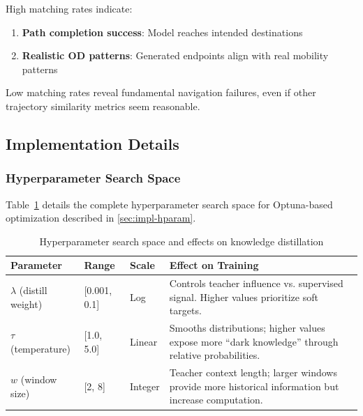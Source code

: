 High matching rates indicate:
\begin{enumerate}[noitemsep,topsep=0pt]
    \item \textbf{Path completion success}: Model reaches intended destinations
    \item \textbf{Realistic OD patterns}: Generated endpoints align with real mobility patterns
\end{enumerate}

Low matching rates reveal fundamental navigation failures, even if other trajectory similarity metrics seem reasonable.

\subsection{Implementation Details}
\label{app:implementation}

\subsubsection{Hyperparameter Search Space}
\label{app:hyperparam-space}

Table~\ref{tab:hyperparam-search-appendix} details the complete hyperparameter search space for Optuna-based optimization described in \autoref{sec:impl-hparam}.

\begin{table}[H]
    \centering
    \caption{Hyperparameter search space and effects on knowledge distillation}
    \label{tab:hyperparam-search-appendix}
    \begin{tabular}{lll p{5.5cm}}
        \toprule
        \textbf{Parameter}         & \textbf{Range} & \textbf{Scale} & \textbf{Effect on Training}                                                                          \\
        \midrule
        $\lambda$ (distill weight) & [0.001, 0.1]   & Log            & Controls teacher influence vs. supervised signal. Higher values prioritize soft targets.             \\
        \addlinespace
        $\tau$ (temperature)       & [1.0, 5.0]     & Linear         & Smooths distributions; higher values expose more ``dark knowledge'' through relative probabilities.  \\
        \addlinespace
        $w$ (window size)          & [2, 8]         & Integer        & Teacher context length; larger windows provide more historical information but increase computation. \\
        \bottomrule
    \end{tabular}
\end{table}

